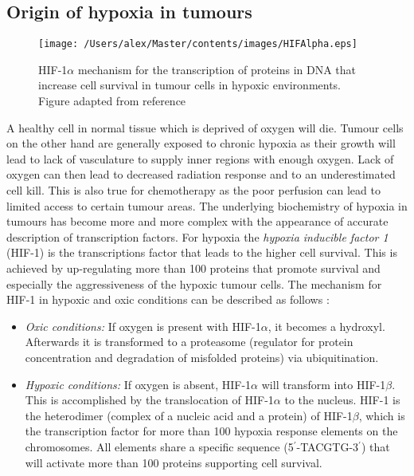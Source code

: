 \subsection{Origin of hypoxia in tumours}\label{chap:hypoxiaorigin}
\begin{figure}[tb]
\centering
\texttt{[image: /Users/alex/Master/contents/images/HIFAlpha.eps]}
\caption{HIF-1$\alpha$ mechanism for the transcription of proteins in DNA that increase cell survival in tumour cells in hypoxic environments. Figure adapted from reference \cite{pmid18523070}}
\label{fig:HIFAlpha}
\end{figure}
A healthy cell in normal tissue which is deprived of oxygen will die. Tumour cells on the other hand are generally exposed to chronic hypoxia as their growth will lead to lack of vasculature to supply inner regions with enough oxygen. Lack of oxygen can then lead to decreased radiation response and to an underestimated cell kill. This is also true for chemotherapy as the poor perfusion can lead to limited access to certain tumour areas. The underlying biochemistry of hypoxia in tumours has become more and more complex with the appearance of accurate description of transcription factors. For hypoxia the \textit{hypoxia inducible factor 1} (HIF-1) is the transcriptions factor that leads to the higher cell survival. This is achieved by up-regulating more than 100 proteins that promote survival and especially the aggressiveness of the hypoxic tumour cells. The mechanism for HIF-1 in hypoxic and oxic conditions can be described as follows \cite{pmid13130303}:
\begin{itemize}
\item \textit{Oxic conditions: }If oxygen is present with HIF-1$\alpha$, it becomes a hydroxyl. Afterwards it is transformed to a proteasome (regulator for protein concentration and degradation of misfolded proteins) via ubiquitination. 
\item \textit{Hypoxic conditions: } If oxygen is absent, HIF-1$\alpha$ will transform into HIF-1$\beta$. This is accomplished by the translocation of HIF-1$\alpha$ to the nucleus. HIF-1 is the heterodimer (complex of a nucleic acid and a protein) of HIF-1$\beta$, which is the transcription factor for more than 100 hypoxia response elements on the chromosomes. All elements share a specific sequence (5$^\prime$-TACGTG-3$^\prime$) that will activate more than 100 proteins supporting cell survival.
\end{itemize}
